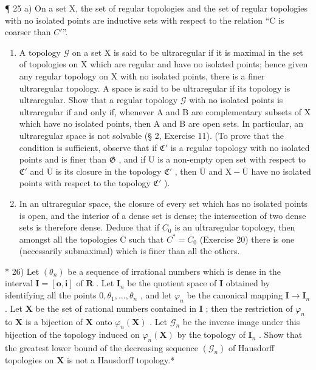¶ 25 a) On a set X, the set of regular topologies and the set of regular topologies with no isolated points are inductive sets with respect to the relation ``C is coarser than \(C'\)''.

\begin{enumerate}
\def\labelenumi{\alph{enumi})}
\setcounter{enumi}{1}
\item
  A topology \(\mathcal{G}\) on a set X is said to be ultraregular if it is maximal in the set of topologies on X which are regular and have no isolated points; hence given any regular topology on X with no isolated points, there is a finer ultraregular topology. A space is said to be ultraregular if its topology is ultraregular. Show that a regular topology \(\mathcal{G}\) with no isolated points is ultraregular if and only if, whenever A and B are complementary subsets of X which have no isolated points, then A and B are open sets. In particular, an ultraregular space is not solvable (§ 2, Exercise 11). (To prove that the condition is sufficient, observe that if \(\mathfrak{C}'\) is a regular topology with no isolated points and is finer than \(\mathfrak{G}\) , and if U is a non-empty open set with respect to \(\mathfrak{C}'\) and \(\overline{\mathrm{U}}\) is its closure in the topology \(\mathfrak{C}'\) , then \(\overline{\mathrm{U}}\) and \(\mathrm{X} - \overline{\mathrm{U}}\) have no isolated points with respect to the topology \(\mathfrak{C}'\) ).
\item
  In an ultraregular space, the closure of every set which has no isolated points is open, and the interior of a dense set is dense; the intersection of two dense sets is therefore dense. Deduce that if \(C_{0}\) is an ultraregular topology, then amongst all the topologies C such that \(C^{*} = C_{0}\) (Exercise 20) there is one (necessarily submaximal) which is finer than all the others.
\end{enumerate}

* 26) Let \((\theta_{n})\) be a sequence of irrational numbers which is dense in the interval \(\mathbf{I} = [\mathbf{o},\mathbf{i}]\) of \(\mathbf{R}\) . Let \(\mathbf{I}_n\) be the quotient space of \(\mathbf{I}\) obtained by identifying all the points \(0, \theta_1, \ldots, \theta_n\) , and let \(\varphi_n\) be the canonical mapping \(\mathbf{I} \to \mathbf{I}_n\) . Let \(\mathbf{X}\) be the set of rational numbers contained in \(\mathbf{I}\) ; then the restriction of \(\varphi_n\) to \(\mathbf{X}\) is a bijection of \(\mathbf{X}\) onto \(\varphi_n(\mathbf{X})\) . Let \(\mathcal{G}_n\) be the inverse image under this bijection of the topology induced on \(\varphi_n(\mathbf{X})\) by the topology of \(\mathbf{I}_n\) . Show that the greatest lower bound of the decreasing sequence \((\mathcal{G}_n)\) of Hausdorff topologies on \(\mathbf{X}\) is not a Hausdorff topology.*

